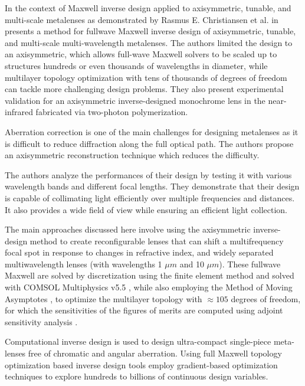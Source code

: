 In the context of Maxwell inverse design applied to axisymmetric, tunable, and multi-scale metalenses as demonstrated by Rasmus E. Christiansen et al. in \cite{christiansenFullwaveMaxwellInverse2020a} presents a method for fullwave Maxwell inverse design of axisymmetric, tunable, and multi-scale multi-wavelength metalenses. The authors limited the design to an axisymmetric, which allows full-wave Maxwell solvers to be scaled up to structures hundreds or even thousands of wavelengths in diameter, while multilayer topology optimization with tens of thousands of degrees of freedom can tackle more challenging design problems. They also present experimental validation for an axisymmetric inverse-designed monochrome lens in the near-infrared fabricated via two-photon polymerization.

Aberration correction is one of the main challenges for designing metalenses as it is difficult to reduce diffraction along the full optical path. The authors propose an axisymmetric reconstruction technique which reduces the difficulty.

The authors analyze the performances of their design by testing it with various wavelength bands and different focal lengths. They demonstrate that their design is capable of collimating light efficiently over multiple frequencies and distances. It also provides a wide field of view while ensuring an efficient light collection.

The main approaches discussed here involve using the axisymmetric inverse-design method to create reconfigurable lenses that can shift a multifrequency focal spot in response to changes in refractive index, and widely separated multiwavelength lenses (with wavelengths 1 $\mu m$ and 10 $\mu m$). These fullwave Maxwell are solved by discretization using the finite element method \cite{FiniteElementMethod} and solved with COMSOL Multiphysics v5.5 \cite{multiphysics1998introduction}, while also employing the Method of Moving Asymptotes \cite{svanbergMethodMovingAsymptotes1987}, to optimize the multilayer topology with $\approx105$ degrees of freedom, for which the sensitivities of the figures of merits are computed using adjoint sensitivity analysis \cite{lalau-keralyAdjointShapeOptimization2013}.

Computational inverse design is used to design ultra-compact single-piece meta-lenses free of chromatic and angular aberration. Using full Maxwell topology optimization \cite{bendsoeTopologyOptimization2004, jensenTopologyOptimizationNanophotonics2011,moleskyInverseDesignNanophotonics2018} based inverse design tools employ gradient-based optimization techniques to explore hundreds to billions of continuous design variables.

